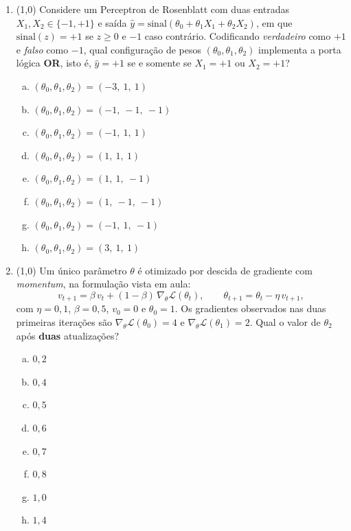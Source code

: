 \documentclass[11pt,a4paper]{article}
\begin{document}
\begin{enumerate}[1)]
\item (1{,}0) Considere um Perceptron de Rosenblatt com duas entradas $X_1, X_2 \in \{-1, +1\}$ e saída $\hat{y} = \mathrm{sinal}(\theta_0 + \theta_1 X_1 + \theta_2 X_2)$, em que $\mathrm{sinal}(z) = +1$ se $z \geq 0$ e $-1$ caso contrário. Codificando \emph{verdadeiro} como $+1$ e \emph{falso} como $-1$, qual configuração de pesos $(\theta_0, \theta_1, \theta_2)$ implementa a porta lógica \textbf{OR}, isto é, $\hat{y} = +1$ se e somente se $X_1 = +1$ ou $X_2 = +1$?

\begin{enumerate}[a)]
    \item $(\theta_0, \theta_1, \theta_2) = (-3,\ 1,\ 1)$
    \item $(\theta_0, \theta_1, \theta_2) = (-1,\ -1,\ -1)$
    \item $(\theta_0, \theta_1, \theta_2) = (-1,\ 1,\ 1)$
    \item $(\theta_0, \theta_1, \theta_2) = (1,\ 1,\ 1)$
    \item $(\theta_0, \theta_1, \theta_2) = (1,\ 1,\ -1)$
    \item $(\theta_0, \theta_1, \theta_2) = (1,\ -1,\ -1)$
    \item $(\theta_0, \theta_1, \theta_2) = (-1,\ 1,\ -1)$
    \item $(\theta_0, \theta_1, \theta_2) = (3,\ 1,\ 1)$
\end{enumerate}

\item (1{,}0) Um único parâmetro $\theta$ é otimizado por descida de gradiente com \textit{momentum}, na formulação vista em aula:
\[
v_{t+1} = \beta\,v_{t} + (1-\beta)\,\nabla_{\theta}\mathcal{L}(\theta_{t}), \qquad \theta_{t+1} = \theta_{t} - \eta\,v_{t+1},
\]
com $\eta = 0{,}1$, $\beta = 0{,}5$, $v_0 = 0$ e $\theta_0 = 1$. Os gradientes observados nas duas primeiras iterações são $\nabla_{\theta}\mathcal{L}(\theta_0) = 4$ e $\nabla_{\theta}\mathcal{L}(\theta_1) = 2$. Qual o valor de $\theta_2$ após \textbf{duas} atualizações?

\begin{enumerate}[a)]
    \item $0{,}2$
    \item $0{,}4$
    \item $0{,}5$
    \item $0{,}6$
    \item $0{,}7$
    \item $0{,}8$
    \item $1{,}0$
    \item $1{,}4$
\end{enumerate}


\end{enumerate}
\end{document}
